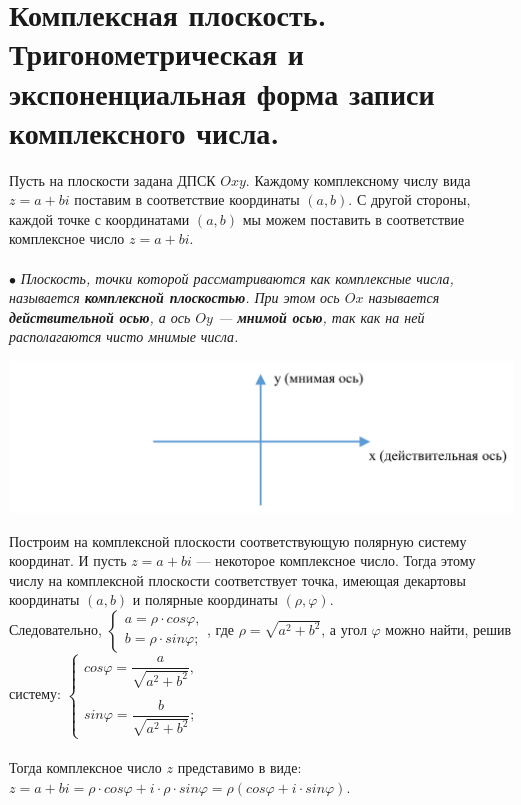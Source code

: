 \section{Комплексная плоскость. Тригонометрическая и экспоненциальная
	форма записи комплексного числа.}
Пусть на плоскости задана ДПСК $Oxy$. Каждому комплексному числу вида $z = a + bi$ поставим в соответствие координаты $(a,b)$. С другой стороны, каждой точке с координатами $(a, b)$ мы можем поставить в соответствие комплексное число $z = a + bi$.\\\\
$\bullet$ \textit{Плоскость, точки которой рассматриваются как комплексные числа, называется \textbf{комплексной плоскостью}. При этом ось $Ox$ называется \textbf{действительной осью}, а ось $Oy$ --- \textbf{мнимой осью}, так как на ней располагаются чисто мнимые числа.}
\begin{center}
	\includegraphics[scale=0.3]{images/kdpsk.png}
\end{center}
Построим на комплексной плоскости соответствующую полярную систему координат. И пусть $z = a + bi$ --- некоторое комплексное число. Тогда этому числу на комплексной плоскости соответствует точка, имеющая декартовы координаты $(a, b)$ и полярные координаты $(\rho, \varphi)$. \\Следовательно, $\begin{cases}
	a = \rho\cdot cos \varphi,\\
	b = \rho\cdot sin \varphi;
\end{cases}$, где $\rho = \sqrt{a^2 + b^2}$, а угол $\varphi$ можно найти, решив систему: $\begin{cases}
	cos \varphi = \dfrac{a}{\sqrt{a^2 + b^2}},\\\\
	sin \varphi = \dfrac{b}{\sqrt{a^2 + b^2}};
\end{cases}$\\\\
Тогда комплексное число $z$ представимо в виде: $z = a+bi= \rho\cdot cos \varphi + i\cdot \rho\cdot sin\varphi = \rho(cos\varphi + i\cdot sin\varphi)$.\\\\
